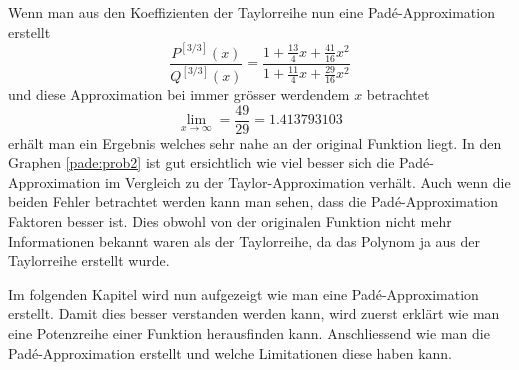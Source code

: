 Wenn man aus den Koeffizienten der Taylorreihe nun eine Padé-Approximation erstellt 
\begin{equation*}
\frac{P^{[3/3]}(x)}{Q^{[3/3]}(x)}
=
\frac{1+\frac{13}{4}x+\frac{41}{16}x^2}{1 + \frac{11}{4}x + \frac{29}{16}x^2} 
\end{equation*}
und diese Approximation bei immer grösser werdendem $x$ betrachtet
\begin{equation*}
\lim_{x \to \infty}
=
\frac{49}{29} = 1.413793103
\end{equation*}
erhält man ein Ergebnis welches sehr nahe an der original Funktion liegt. 
In den Graphen \ref{pade:prob2} ist gut ersichtlich wie viel besser sich die Padé-Approximation im Vergleich zu der Taylor-Approximation verhält.
Auch wenn die beiden Fehler betrachtet werden kann man sehen, dass die Padé-Approximation Faktoren besser ist.
Dies obwohl von der originalen Funktion nicht mehr Informationen bekannt waren als der Taylorreihe, da das Polynom ja aus der Taylorreihe erstellt wurde.

Im folgenden Kapitel wird nun aufgezeigt wie man eine Padé-Approximation erstellt.
Damit dies besser verstanden werden kann, wird zuerst erklärt wie man eine Potenzreihe einer Funktion herausfinden kann.
Anschliessend wie man die Padé-Approximation erstellt und welche Limitationen diese haben kann.



 


